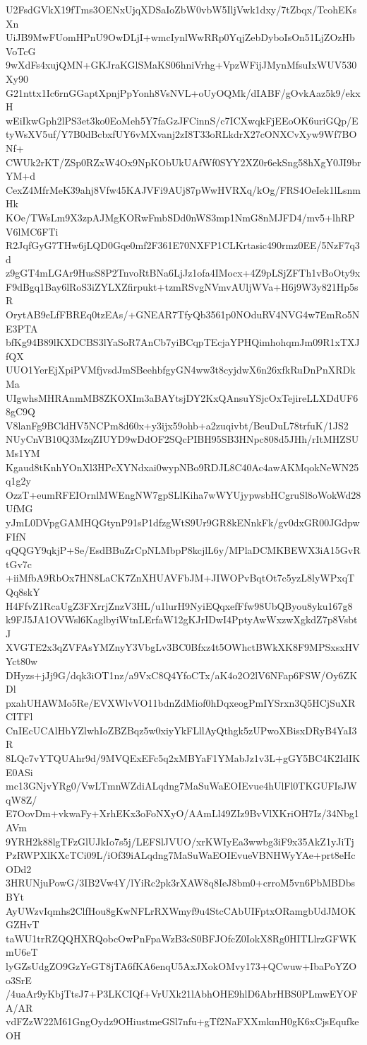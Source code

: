 U2FsdGVkX19fTms3OENxUjqXDSaIoZbW0vbW5IljVwk1dxy/7tZbqx/TcohEKsXn
UiJB9MwFUomHPnU9OwDLjI+wmcIynlWwRRp0YqjZebDyboIsOn51LjZOzHbVoTcG
9wXdFs4xujQMN+GKJraKGlSMaKS06hniVrhg+VpzWFijJMynMfsuIxWUV530Xy90
G21nttx1Ic6rnGGaptXpnjPpYonh8VsNVL+oUyOQMk/dIABF/gOvkAaz5k9/ekxH
wEiIkwGph2lPS3et3ko0EoMeh5Y7faGzJFCinnS/c7ICXwqkFjEEoOK6uriGQp/E
tyWsXV5uf/Y7B0dBcbxfUY6vMXvanj2zI8T33oRLkdrX27cONXCvXyw9Wf7BONf+
CWUk2rKT/ZSp0RZxW4Ox9NpKObUkUAfWf0SYY2XZ0r6ekSng58hXgY0JI9brYM+d
CexZ4MfrMeK39ahj8Vfw45KAJVFi9AUj87pWwHVRXq/kOg/FRS4OeIek1lLsnmHk
KOe/TWsLm9X3zpAJMgKORwFmbSDd0nWS3mp1NmG8nMJFD4/mv5+lhRPV6lMC6FTi
R2JqfGyG7THw6jLQD0Gqe0mf2F361E70NXFP1CLKrtasic490rmz0EE/5NzF7q3d
z9gGT4mLGAr9HusS8P2TnvoRtBNa6LjJz1ofa4IMocx+4Z9pLSjZFTh1vBoOty9x
F9dBgq1Bay6lRoS3iZYLXZfirpukt+tzmRSvgNVmvAUljWVa+H6j9W3y821Hp5sR
OrytAB9eLfFBREq0tzEAs/+GNEAR7TfyQb3561p0NOduRV4NVG4w7EmRo5NE3PTA
bfKg94B89lKXDCBS3lYaSoR7AnCb7yiBCqpTEcjaYPHQimhohqmJm09R1xTXJfQX
UUO1YerEjXpiPVMfjvsdJmSBeehbfgyGN4ww3t8cyjdwX6n26xfkRuDnPnXRDkMa
UIgwhsMHRAnmMB8ZKOXIm3aBAYtsjDY2KxQAnsuYSjcOxTejireLLXDdUF68gC9Q
V8lanFg9BCldHV5NCPm8d60x+y3ijx59ohb+a2zuqivbt/BeuDuL78trfuK/1JS2
NUyCnVB10Q3MzqZIUYD9wDdOF2SQcPIBH95SB3HNpc808d5JHh/rItMHZSUMs1YM
Kgaud8tKnhYOnXl3HPcXYNdxai0wypNBo9RDJL8C40Ac4awAKMqokNeWN25q1g2y
OzzT+eumRFEIOrnlMWEngNW7gpSLlKiha7wWYUjypwsbHCgruSl8oWokWd28UfMG
yJmL0DVpgGAMHQGtynP91sP1dfzgWtS9Ur9GR8kENnkFk/gv0dxGR00JGdpwFIfN
qQQGY9qkjP+Se/EsdBBuZrCpNLMbpP8kcjlL6y/MPlaDCMKBEWX3iA15GvRtGv7c
+iiMfbA9RbOx7HN8LaCK7ZnXHUAVFbJM+JIWOPvBqtOt7c5yzL8lyWPxqTQq8skY
H4FfvZ1RcaUgZ3FXrrjZnzV3HL/u1lurH9NyiEQqxefFfw98UbQByou8yku167g8
k9FJ5JA1OVWsl6KaglbyiWtnLErfaW12gKJrIDwI4PptyAwWxzwXgkdZ7p8VsbtJ
XVGTE2x3qZVFAsYMZnyY3VbgLv3BC0Bfxz4t5OWhctBWkXK8F9MPSxsxHVYct80w
DHyzs+jJj9G/dqk3iOT1nz/a9VxC8Q4YfoCTx/aK4o2O2lV6NFap6FSW/Oy6ZKDl
pxahUHAWMo5Re/EVXWlvVO11bdnZdMiof0hDqxeogPmIYSrxn3Q5HCjSuXRCITFl
CnIEcUCAlHbYZlwhIoZBZBqz5w0xiyYkFLllAyQthgk5zUPwoXBisxDRyB4YaI3R
8LQc7vYTQUAhr9d/9MVQExEFc5q2xMBYaF1YMabJz1v3L+gGY5BC4K2IdIKE0ASi
mc13GNjvYRg0/VwLTmnWZdiALqdng7MaSuWaEOIEvue4hUlFl0TKGUFIsJWqW8Z/
E7OovDm+vkwaFy+XrhEKx3oFoNXyO/AAmLl49ZIz9BvVlXKriOH7Iz/34Nbg1AVm
9YRH2k88lgTFzGlUJkIo7s5j/LEFSlJVUO/xrKWIyEa3wwbg3iF9x35AkZ1yJiTj
PzRWPXlKXcTCi09L/iOf39iALqdng7MaSuWaEOIEvueVBNHWyYAe+prt8eHcODd2
3HRUNjuPowG/3IB2Vw4Y/lYiRc2pk3rXAW8q8IeJ8bm0+crroM5vn6PbMBDbsBYt
AyUWzvIqmhs2ClfHou8gKwNFLrRXWmyf9u4StcCAbUIFptxORamgbUdJMOKGZHvT
taWU1trRZQQHXRQobcOwPnFpaWzB3cS0BFJOfcZ0IokX8Rg0HITLlrzGFWKmU6eT
lyGZsUdgZO9GzYeGT8jTA6fKA6enqU5AxJXokOMvy173+QCwuw+IbaPoYZOo3SrE
/4uaAr9yKbjTtsJ7+P3LKCIQf+VrUXk21lAbhOHE9hlD6AbrHBS0PLmwEYOFA/AR
vdFZzW22M61GngOydz9OHiustmeGSl7nfu+gTf2NaFXXmkmH0gK6xCjsEqufkeOH
